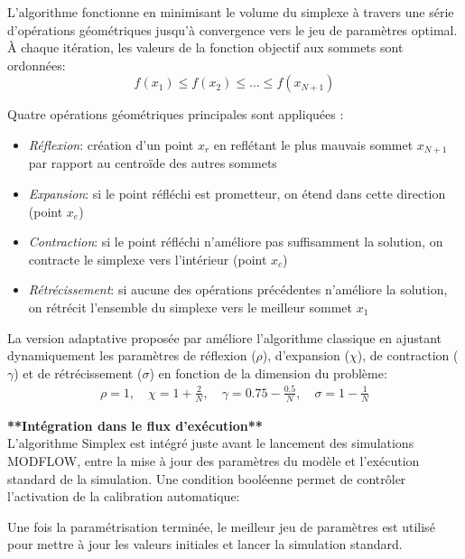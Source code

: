 L'algorithme fonctionne en minimisant le volume du simplexe à travers une série d'opérations géométriques jusqu'à convergence vers le jeu de paramètres optimal. À chaque itération, les valeurs de la fonction objectif aux sommets sont ordonnées:
\begin{equation}
f(x_1) \leq f(x_2) \leq \ldots \leq f(x_{N+1})
\end{equation}

Quatre opérations géométriques principales sont appliquées \parencite{gaoImplementingNelderMeadSimplex2012}:
\begin{itemize}
\item \textit{Réflexion}: création d'un point $x_r$ en reflétant le plus mauvais sommet $x_{N+1}$ par rapport au centroïde des autres sommets
\item \textit{Expansion}: si le point réfléchi est prometteur, on étend dans cette direction (point $x_e$)
\item \textit{Contraction}: si le point réfléchi n'améliore pas suffisamment la solution, on contracte le simplexe vers l'intérieur (point $x_c$)
\item \textit{Rétrécissement}: si aucune des opérations précédentes n'améliore la solution, on rétrécit l'ensemble du simplexe vers le meilleur sommet $x_1$
\end{itemize}

La version adaptative proposée par \textcite{gaoImplementingNelderMeadSimplex2012} améliore l'algorithme classique en ajustant dynamiquement les paramètres de réflexion ($\rho$), d'expansion ($\chi$), de contraction ($\gamma$) et de rétrécissement ($\sigma$) en fonction de la dimension du problème:
\begin{align}
\rho = 1, \quad \chi = 1 + \frac{2}{N}, \quad \gamma = 0.75 - \frac{0.5}{N}, \quad \sigma = 1 - \frac{1}{N}
\end{align}

\vspace{2em}
\noindent\textbf{**Intégration dans le flux d'exécution**}\\

L'algorithme Simplex est intégré juste avant le lancement des simulations MODFLOW, entre la mise à jour des paramètres du modèle et l'exécution standard de la simulation. Une condition booléenne permet de contrôler l'activation de la calibration automatique:


Une fois la paramétrisation terminée, le meilleur jeu de paramètres est utilisé pour mettre à jour les valeurs initiales et lancer la simulation standard.

